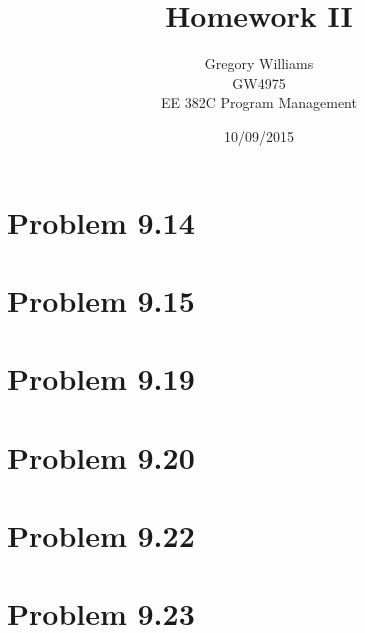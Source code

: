 \documentclass{article}
\title{Homework II}
\author{Gregory Williams\\GW4975\\EE 382C Program Management}
\date{10/09/2015}
\begin{document}
	\maketitle
	\section*{Problem 9.14}
	
	\section*{Problem 9.15}
	
	\section*{Problem 9.19}
	
	\section*{Problem 9.20}
		
	\section*{Problem 9.22}
	
	\section*{Problem 9.23}
	
\end{document}
